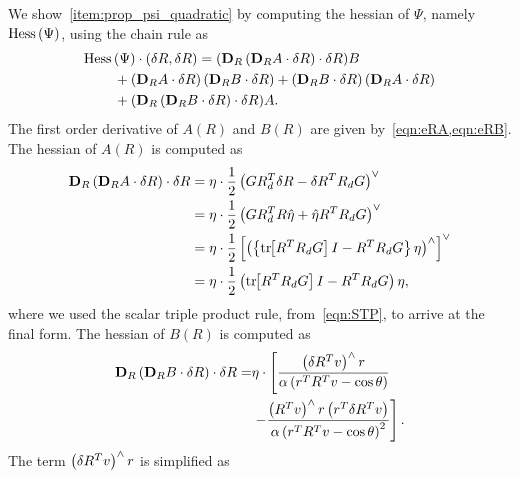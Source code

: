 We show~\cref{item:prop_psi_quadratic} by computing the hessian of \( \Psi \), namely \( \mathrm{Hess} \, (\Psi) \),  using the chain rule as 
\begin{align*}
    \Hess &(\Psi)\cdot (\delta R,\delta R)= (\mathbf{D}_R\parenth{\mathbf{D}_R A \cdot \delta R}\cdot \delta R) B\\
    & + \parenth{\dirDiff{A}{R} }\parenth{\dirDiff{B}{R}} 
    + \parenth{\dirDiff{B}{R} }\parenth{\dirDiff{A}{R}}\\ &+(\mathbf{D}_R\parenth{\mathbf{D}_R B \cdot \delta R}\cdot \delta R) A.
\end{align*}
The first order derivative of \( A(R) \) and \( B(R) \) are given by~\cref{eqn:eRA,eqn:eRB}. 
The hessian of \( A(R) \) is computed as 
\begin{align*}
    \mathbf{D}_{R} \left( \mathbf{D}_{R} A \cdot \delta R \right) \cdot \delta R &= \eta \cdot \frac{1}{2}\left( G R_d^T \delta R - \delta R^T R_d G \right)^\vee  \\
    &= \eta \cdot \frac{1}{2} \left( G R_d^T R \hat \eta + \hat \eta R^T R_d G \right)^\vee\\
    &= \eta \cdot \frac{1}{2} \left[ \left( \left\{ \mathrm{tr}\negthickspace\left[ R^T R_d G \right] I - R^T R_d G \right\} \eta \right)^\wedge \right]^\vee  \\
    &= \eta \cdot \frac{1}{2} \left( \mathrm{tr}\negthickspace\left[ R^T R_d G \right] I - R^T R_d G \right)\eta ,
\end{align*}
where we used the scalar triple product rule, from~\cref{eqn:STP}, to arrive at the final form.
The hessian of \( B(R) \) is computed as
\begin{align*}
    \mathbf{D}_{R} \left( \mathbf{D}_{R} B \cdot \delta R \right) \cdot \delta R =& \eta \cdot \left[\frac{\left( \delta R^T v \right)^\wedge r}{\alpha\left( r^T R^T v - \cos \theta \right)} \right. \\
    & \left. - \frac{\left( R^T v \right)^\wedge r \left( r^T \delta R^T v \right)}{\alpha \left( r^TR^Tv - \cos \theta \right)^2}   \right] .
\end{align*}
The term \( \left( \delta R^T v \right)^\wedge r\) is simplified as

